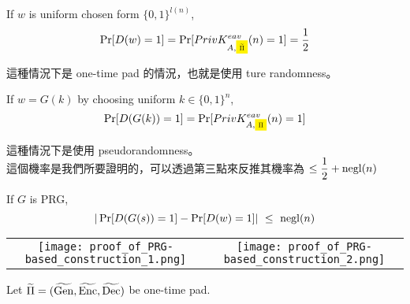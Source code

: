 \begin{myEnumerate}
	\item If \(w\) is uniform chosen form \(\{0, 1\}^{l(n)}\),		
		\begingroup
		\setlength{\fboxsep}{1pt}
		\[ \Pr[D(w) = 1] = \Pr[PrivK_{A, \colorbox{yellow}{\scalebox{0.6}{\(\widetilde{\Pi}\)}}}^{eav}(n) = 1]
							= \frac{1}{2}\]
		\endgroup
		
		這種情況下是 one-time pad 的情況，也就是使用 ture randomness。
		
	\item If \(w = G(k)\) by choosing uniform \(k \in \{0, 1\}^n\),
		\begingroup
		\setlength{\fboxsep}{1pt}
		\[ \Pr[D(G(k)) = 1] = \Pr[PrivK_{A, 
		\colorbox{yellow}{\scalebox{0.6}{\(\Pi\)}}}^{eav}(n) = 1]\]
		\endgroup
		
		這種情況下是使用 pseudorandomness。 \\
		這個機率是我們所要證明的，可以透過第三點來反推其機率為 \(\leq \displaystyle\frac{1}{2} + \operatorname{negl}(n)\)
		
	\item If \(G\) is PRG,
		\[ | \Pr[D(G(s)) = 1] - \Pr[D(w) = 1] | \ \leq \ \operatorname{negl}(n)\]
\end{myEnumerate}

\begin{center}
	\begin{tabularx}{1.2\textwidth}{c c}
		\texttt{[image: proof\_of\_PRG-based\_construction\_1.png]}
		&	
		\texttt{[image: proof\_of\_PRG-based\_construction\_2.png]}
	\end{tabularx}
\end{center}

\begin{myProof}
	Let \(\widetilde{\Pi} = (\widetilde{\operatorname{Gen}}, \widetilde{\operatorname{Enc}}, \widetilde{\operatorname{Dec}})\) be one-time pad.
	
	
	
\end{myProof}

